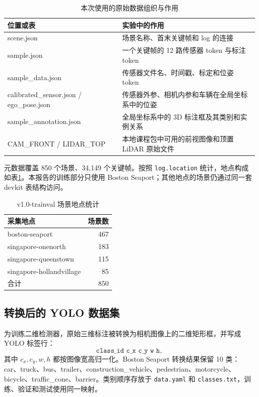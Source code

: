 \documentclass[UTF8,zihao=-4,fontset=windows]{ctexart}
\begin{document}
\begin{table}[H]
  \centering
  \caption{本次使用的原始数据组织与作用}
  \begin{tabularx}{\textwidth}{>{\raggedright\ttfamily\scriptsize\arraybackslash}p{3.6cm}X}
    \toprule
    位置或表 & 实验中的作用 \\
    \midrule
    scene.json & 场景名称、首末关键帧和 log 的连接 \\
    sample.json & 一个关键帧的 12 路传感器 token 与标注 token \\
    sample\_data.json & 传感器文件名、时间戳、标定和位姿 token \\
    calibrated\_sensor.json / ego\_pose.json & 传感器外参、相机内参和车辆在全局坐标系中的位姿 \\
    sample\_annotation.json & 全局坐标系中的 3D 标注框及其类别和实例关系 \\
    CAM\_FRONT / LIDAR\_TOP & 本地课程包中可用的前视图像和顶置 LiDAR 原始文件 \\
    \bottomrule
  \end{tabularx}
\end{table}

元数据覆盖 850 个场景、34,149 个关键帧。按照 \texttt{log.location} 统计，地点构成如表\ref{tab:location}。本报告的训练部分只使用 Boston Seaport；其他地点的场景仍通过同一套 devkit 表结构访问。

\begin{table}[H]
  \centering
  \caption{v1.0-trainval 场景地点统计}
  \label{tab:location}
  \begin{tabular}{lr}
    \toprule
    采集地点 & 场景数 \\
    \midrule
    boston-seaport & 467 \\
    singapore-onenorth & 183 \\
    singapore-queenstown & 115 \\
    singapore-hollandvillage & 85 \\
    \midrule
    合计 & 850 \\
    \bottomrule
  \end{tabular}
\end{table}

\subsection{转换后的 YOLO 数据集}

为训练二维检测器，原始三维标注被转换为相机图像上的二维矩形框，并写成 YOLO 标签行：
\[
\texttt{class\_id\ \ c\_x\ \ c\_y\ \ w\ \ h},
\]
其中 $c_x,c_y,w,h$ 都按图像宽高归一化。Boston Seaport 转换结果保留 10 类：car、truck、bus、trailer、construction\_vehicle、pedestrian、motorcycle、bicycle、traffic\_cone、barrier。类别顺序存放于 \texttt{data.yaml} 和 \texttt{classes.txt}，训练、验证和测试使用同一映射。
\end{document}
